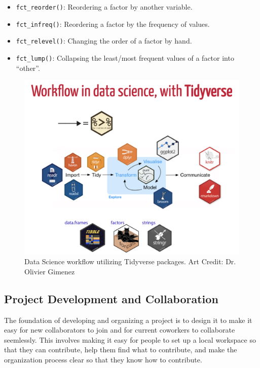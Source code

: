 \documentclass[
]{book}
\providecommand{\tightlist}{%
  \setlength{\itemsep}{0pt}\setlength{\parskip}{0pt}}
\begin{document}
\begin{itemize}
  \begin{itemize}
  \tightlist
  \item
    \texttt{fct\_reorder()}: Reordering a factor by another variable.
  \item
    \texttt{fct\_infreq()}: Reordering a factor by the frequency of values.
  \item
    \texttt{fct\_relevel()}: Changing the order of a factor by hand.
  \item
    \texttt{fct\_lump()}: Collapsing the least/most frequent values of a factor into ``other''.
  \end{itemize}
\end{itemize}

\begin{figure}

{\centering \includegraphics[width=1\linewidth]{images/tidyverse} 

}

\caption{Data Science workflow utilizing Tidyverse packages. Art Credit: Dr. Olivier Gimenez}\label{fig:tidyverse}
\end{figure}

\hypertarget{project-development-and-collaboration}{%
\subsection{Project Development and Collaboration}\label{project-development-and-collaboration}}

The foundation of developing and organizing a project is to design it to make it easy for new collaborators to join and for current coworkers to collaborate seemlessly. This involves making it easy for people to set up a local workspace so that they can contribute, help them find what to contribute, and make the organization process clear so that they know how to contribute.
\end{document}
